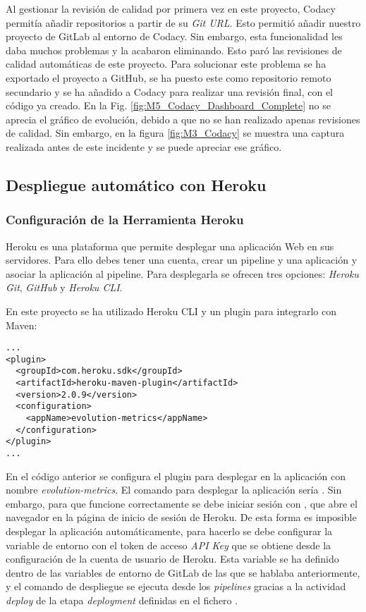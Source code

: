 Al gestionar la revisión de calidad por primera vez en este proyecto, Codacy permitía añadir repositorios a partir de su \textit{Git URL}. Esto permitió añadir nuestro proyecto de GitLab al entorno de Codacy. Sin embargo, esta funcionalidad les daba muchos problemas y la acabaron eliminando. Esto paró las revisiones de calidad automáticas de este proyecto. Para solucionar este problema se ha exportado el proyecto a GitHub, se ha puesto este como repositorio remoto secundario y se ha añadido a Codacy para realizar una revisión final, con el código ya creado. En la Fig. \ref{fig:M5_Codacy_Dashboard_Complete} no se aprecia el gráfico de evolución, debido a que no se han realizado apenas revisiones de calidad. Sin embargo, en la figura \ref{fig:M3_Codacy} se muestra una captura realizada antes de este incidente y se puede apreciar ese gráfico.

\subsection{Despliegue automático con Heroku}

\subsubsection{Configuración de la Herramienta Heroku}

Heroku es una plataforma que permite desplegar una aplicación Web en sus servidores. Para ello debes tener una cuenta, crear un pipeline y una aplicación y asociar la aplicación al pipeline. Para desplegarla se ofrecen tres opciones: \textit{Heroku Git}, \textit{GitHub} y \textit{Heroku CLI}.

En este proyecto se ha utilizado Heroku CLI y un plugin para integrarlo con Maven:\\
\begin{minipage}{\linewidth}
{\tiny
\begin{lstlisting}[breaklines]
...
<plugin>
  <groupId>com.heroku.sdk</groupId>
  <artifactId>heroku-maven-plugin</artifactId>
  <version>2.0.9</version>
  <configuration>
	<appName>evolution-metrics</appName>
  </configuration>
</plugin>
...
\end{lstlisting}
}
\end{minipage}

En el código anterior se configura el plugin para desplegar en la aplicación con nombre \textit{evolution-metrics}. El comando para  desplegar la aplicación sería . Sin embargo, para que funcione correctamente se debe iniciar sesión con , que abre el navegador en la página de inicio de sesión de Heroku. De esta forma es imposible desplegar la aplicación automáticamente, para hacerlo se debe configurar la variable de entorno  con el token de acceso \textit{API Key} que se obtiene desde la configuración de la cuenta de usuario de Heroku. Esta variable se ha definido dentro de las variables de entorno de GitLab de las que se hablaba anteriormente, y el comando de despliegue se ejecuta desde los \textit{pipelines} gracias a la actividad \textit{deploy} de la etapa \textit{deployment} definidas en el fichero .

